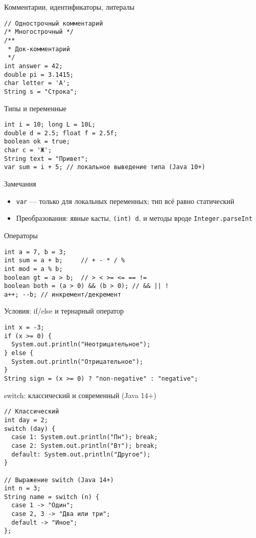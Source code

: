 \documentclass[aspectratio=169]{beamer}
\begin{document}
\begin{frame}[fragile]{Комментарии, идентификаторы, литералы}
\lstset{language=JavaLite}
\begin{lstlisting}
// Однострочный комментарий
/* Многострочный */
/**
 * Док-комментарий
 */
int answer = 42;
double pi = 3.1415;
char letter = 'A';
String s = "Строка";
\end{lstlisting}
\end{frame}

\begin{frame}[fragile]{Типы и переменные}
\lstset{language=JavaLite}
\begin{lstlisting}
int i = 10; long L = 10L;
double d = 2.5; float f = 2.5f;
boolean ok = true;
char c = 'Ж';
String text = "Привет";
var sum = i + 5; // локальное выведение типа (Java 10+)
\end{lstlisting}
\begin{block}{Замечания}
  \begin{itemize}
    \item \texttt{var} — только для локальных переменных; тип всё равно статический
    \item Преобразования: явные касты, \texttt{(int) d}, и методы вроде \texttt{Integer.parseInt}
  \end{itemize}
\end{block}
\end{frame}

\begin{frame}[fragile]{Операторы}
\lstset{language=JavaLite}
\begin{lstlisting}
int a = 7, b = 3;
int sum = a + b;     // + - * / %
int mod = a % b;
boolean gt = a > b;  // > < >= <= == !=
boolean both = (a > 0) && (b > 0); // && || !
a++; --b; // инкремент/декремент
\end{lstlisting}
\end{frame}

\begin{frame}[fragile]{Условия: if/else и тернарный оператор}
\lstset{language=JavaLite}
\begin{lstlisting}
int x = -3;
if (x >= 0) {
  System.out.println("Неотрицательное");
} else {
  System.out.println("Отрицательное");
}
String sign = (x >= 0) ? "non-negative" : "negative";
\end{lstlisting}
\end{frame}

\begin{frame}[fragile]{switch: классический и современный (Java 14+)}
\lstset{language=JavaLite}
\begin{lstlisting}
// Классический
int day = 2;
switch (day) {
  case 1: System.out.println("Пн"); break;
  case 2: System.out.println("Вт"); break;
  default: System.out.println("Другое");
}

// Выражение switch (Java 14+)
int n = 3;
String name = switch (n) {
  case 1 -> "Один";
  case 2, 3 -> "Два или три";
  default -> "Иное";
};
\end{lstlisting}
\end{frame}
\end{document}

